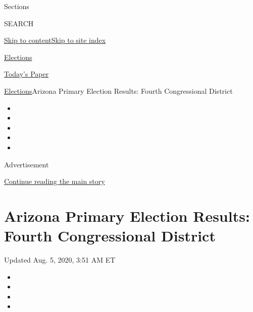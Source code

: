 Sections

SEARCH

\protect\hyperlink{site-content}{Skip to
content}\protect\hyperlink{site-index}{Skip to site index}

\href{https://www.nytimes3xbfgragh.onion/news-event/2020-election}{Elections}

\href{https://myaccount.nytimes3xbfgragh.onion/auth/login?response_type=cookie\&client_id=vi}{}

\href{https://www.nytimes3xbfgragh.onion/section/todayspaper}{Today's
Paper}

\href{/news-event/2020-election}{Elections}\textbar{}Arizona Primary
Election Results: Fourth Congressional District

\begin{itemize}
\item
\item
\item
\item
\item
\end{itemize}

Advertisement

\protect\hyperlink{after-top}{Continue reading the main story}

\hypertarget{arizona-primary-election-results-fourth-congressional-district}{%
\section{Arizona Primary Election Results: Fourth Congressional
District}\label{arizona-primary-election-results-fourth-congressional-district}}

Updated Aug. 5, 2020, 3:51 AM ET

\begin{itemize}
\item
\item
\item
\item
\end{itemize}

